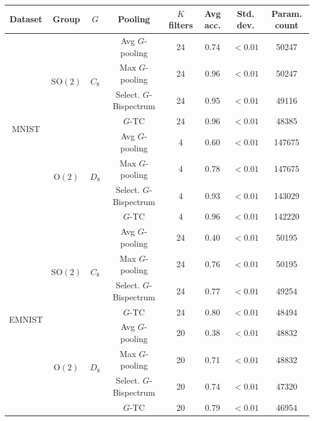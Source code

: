 \documentclass{article}
\theoremstyle{plain}
\theoremstyle{definition}
\theoremstyle{remark}
\begin{document}
\begin{table}
\centering
\small
\begin{tabular}{||c|c|c|c|c|c|c|c||}
	\hline
	Dataset&Group&$G$&Pooling&$K$ filters&Avg acc.&Std. dev.&Param. count\\
 \hline
	\hline
	\multirow{8}{*}{MNIST}&\multirow{4}{*}{$\mathrm{SO}(2)$}&\multirow{4}{*}{$C_8$}&Avg $G$-pooling&24&0.74 &$<0.01$ &50247\\
	     &       &       &Max $G$-pooling&24& 0.96& $<0.01$ &50247\\
	     &       &       &Select. $G$-Bispectrum&24&0.95 &$<0.01$  &49116\\
	     &       &       &$G$-TC&24&0.96 &  $<0.01$&48385\\
        \cline{2-8}
	     &\multirow{4}{*}{$\mathrm{O}(2)$}&\multirow{4}{*}{$D_8$}&Avg $G$-pooling&4& 0.60&$<0.01$ &147675\\
	     &       &       &Max $G$-pooling&4&0.78 &  $<0.01$&147675\\
	     &        &      &Select. $G$-Bispectrum&4&0.93 & $<0.01$ &143029\\
	     &        &      &$G$-TC&4&0.96 &  $<0.01$&142220\\
	\hline
	\multirow{8}{*}{EMNIST}&\multirow{4}{*}{$\mathrm{SO}(2)$}&\multirow{4}{*}{$C_8$}&Avg $G$-pooling&24&0.40 &$<0.01$ &50195\\
	     &       &       &Max $G$-pooling&24& 0.76& $<0.01$ &50195\\
	     &       &       &Select. $G$-Bispectrum&24&0.77 & $<0.01$ &49254\\
	     &       &      &$G$-TC&24&0.80 &  $<0.01$&48494\\
	\cline{2-8}
	     &\multirow{4}{*}{$\mathrm{O}(2)$}&\multirow{4}{*}{$D_8$}&Avg $G$-pooling&20&0.38 &$<0.01$ &48832\\
	     &      &        &Max $G$-pooling&20&0.71 & $<0.01$ &48832\\
	     &      &        &Select. $G$-Bispectrum&20&0.74 & $<0.01$ &47320\\
	     &     &        &$G$-TC&20&0.79 & $<0.01$ &46954\\
	\hline

\end{tabular}
\end{table}
\end{document}
